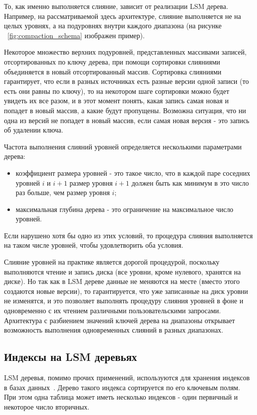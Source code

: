 \documentclass[a4paper,hidelinks,12pt]{article}
\begin{document}
То, как именно выполняется слияние, зависит от реализации LSM дерева. Например,
на рассматриваемой здесь архитектуре, слияние выполняется не на целых уровнях, а
на подуровнях внутри каждого диапазона (на рисунке ~\ref{fig:compaction_schema}
изображен пример).

Некоторое множество верхних подуровней, представленных массивами записей,
отсортированных по ключу дерева, при помощи сортировки слияниями объединяется
в новый отсортированный массив. Сортировка слияниями гарантирует, что если
в разных источниках есть разные версии одной записи (то есть они равны по
ключу), то на некотором шаге сортировки можно будет увидеть их все разом, и в
этот момент понять, какая запись самая новая и попадет в новый массив, а какие
будут пропущены. Возможна ситуация, что ни одна из версий не попадет в новый
массив, если самая новая версия - это запись об удалении ключа.

Частота выполнения слияний уровней определяется несколькими параметрами дерева:
\begin{itemize}
\item коэффициент размера уровней - это такое число, что в каждой паре соседних
уровней $i$ и $i + 1$ размер уровня $i + 1$ должен быть как минимум в это число
раз больше, чем размер уровня $i$;
\item максимальная глубина дерева - это ограничение на максимальное число
уровней.
\end{itemize}

Если нарушено хотя бы одно из этих условий, то процедура слияния выполняется на
таком числе уровней, чтобы удовлетворить оба условия.

Слияние уровней на практике является дорогой процедурой, поскольку выполняются
чтение и запись диска (все уровни, кроме нулевого, хранятся на диске). Но так
как в LSM дереве данные не меняются на месте (вместо этого создаются новые
версии), то гарантируется, что уже записанные на диск уровни не изменятся, и это
позволяет выполнять процедуру слияния уровней в фоне и одновременно с их чтением
различными пользовательскими запросами. Архитектура с разбиением значений ключей
дерева на диапазоны открывает возможность выполнения одновременных слияний в
разных диапазонах.

\subsection{Индексы на LSM деревьях}

LSM деревья, помимо прочих применений, используются для хранения индексов в
базах данных~\cite{leveldb, rocksdb, tarantool}. Дерево такого индекса
сортируется по его ключевым полям. При этом одна таблица может иметь несколько
индексов - один первичный и некоторое число вторичных.
\end{document}
